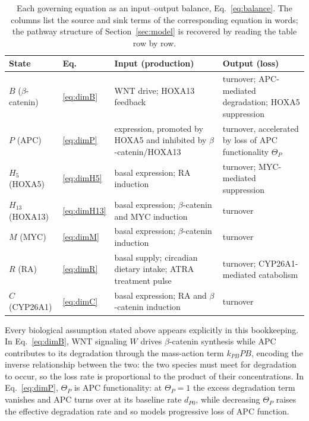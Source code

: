 \documentclass[11pt]{article}
\newcommand{\bcat}{$\beta$-\hspace{0pt}catenin}
\begin{document}
\begin{table}[H]
\centering
\small
\begin{tabular}{llL{5.4cm}L{4.0cm}}
\toprule
\textbf{State} & \textbf{Eq.} & \textbf{Input (production)} & \textbf{Output (loss)}\\
\midrule
$B$ (\bcat{})   & \eqref{eq:dimB}   & WNT drive; HOXA13 feedback
                                    & turnover; APC-mediated degradation;
                                      HOXA5 suppression \\
$P$ (APC)       & \eqref{eq:dimP}   & expression, promoted by HOXA5 and
                                      inhibited by \bcat{}/HOXA13
                                    & turnover, accelerated by loss of APC
                                      functionality $\Theta_P$ \\
$H_5$ (HOXA5)   & \eqref{eq:dimH5}  & basal expression; RA induction
                                    & turnover; MYC-mediated suppression \\
$H_{13}$ (HOXA13) & \eqref{eq:dimH13} & basal expression; \bcat{} and MYC
                                        induction
                                    & turnover \\
$M$ (MYC)       & \eqref{eq:dimM}   & basal expression; \bcat{} induction
                                    & turnover \\
$R$ (RA)        & \eqref{eq:dimR}   & basal supply; circadian dietary intake;
                                      ATRA treatment pulse
                                    & turnover; CYP26A1-mediated catabolism \\
$C$ (CYP26A1)   & \eqref{eq:dimC}   & basal expression; RA and \bcat{}
                                      induction
                                    & turnover \\
\bottomrule
\end{tabular}
\caption{Each governing equation as an input--output balance,
Eq.~\eqref{eq:balance}. The columns list the source and sink terms of the
corresponding equation in words; the pathway structure of
Section~\ref{sec:model} is recovered by reading the table row by row.}
\label{tab:balance}
\end{table}

Every biological assumption stated above appears explicitly in this bookkeeping.
In Eq.~\eqref{eq:dimB}, WNT signaling $W$ drives \bcat{} synthesis while APC
contributes to its degradation through the mass-action term $k_{PB}PB$,
encoding the inverse relationship between the two: the two species must meet
for degradation to occur, so the loss rate is proportional to the product of
their concentrations. In Eq.~\eqref{eq:dimP}, $\Theta_P$ is APC
functionality: at $\Theta_P = 1$ the excess degradation term vanishes and APC
turns over at its baseline rate $d_{P0}$, while decreasing $\Theta_P$ raises
the effective degradation rate and so models progressive loss of APC function.
\end{document}
